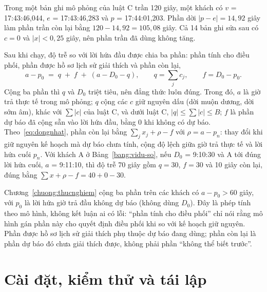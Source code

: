 Trong một bản ghi mô phỏng của luật C trần 120 giây, một khách có $v$ = 17:43:46,044, $e$ = 17:43:46,283 và
$p$ = 17:44:01,203. Phần dời $|p - e| = 14{,}92$ giây làm phần trần còn lại bằng $120 - 14{,}92 = 105{,}08$ giây.
Cả 14 bản ghi sửa sau có $c = 0$ và $|x| < 0{,}25$ giây, nên phần trần đã dùng không tăng.

Sau khi chạy, độ trễ so với lời hứa đầu được chia ba phần: phần tính cho điều phối, phần được hồ sơ lịch sử giải
thích và phần còn lại,
\begin{equation}
a - p_0 \;=\; q \;+\; f \;+\; (a - D_0 - q), \qquad q = \sum_{j} c_j, \qquad f = D_0 - p_0 .
\label{eq:so}
\end{equation}
Cộng ba phần thì $q$ và $D_0$ triệt tiêu, nên đẳng thức luôn đúng. Trong đó, $a$ là giờ trả thực tế trong mô
phỏng; $q$ cộng các $c$ giữ nguyên dấu (dời muộn dương, dời sớm âm), khác với $\sum |c|$ của luật C, và dưới luật
C, $|q| \le \sum |c| \le B$; $f$ là phần dự báo đã cộng sẵn vào lời hứa đầu, bằng 0 khi không có dự báo.
Theo~\eqref{eq:dongnhat}, phần còn lại bằng $\sum_j x_j + \rho - f$ với $\rho = a - p_n$: thay đổi khi giữ nguyên
kế hoạch mà dự báo chưa tính, cộng độ lệch giữa giờ trả thực tế và lời hứa cuối $p_n$. Với khách A ở
Bảng~\ref{bang:vidu-so}, nếu $D_0$ = 9:10:30 và A tới đúng lời hứa cuối, $a$ = 9:11:10, thì độ trễ 70 giây gồm
$q = 30$, $f = 30$ và 10 giây còn lại, đúng bằng $\sum x + \rho - f = 40 + 0 - 30$.

Chương~\ref{chuong:thucnghiem} cộng ba phần trên các khách có $a - p_0 > 60$ giây, với $p_0$ là lời hứa giờ trả
đầu không dự báo (không dùng $D_0$). Đây là phép tính theo mô hình, không kết luận ai có lỗi: ``phần tính cho điều
phối'' chỉ nói rằng mô hình gán phần này cho quyết định điều phối khi so với kế hoạch giữ nguyên. Phần được hồ sơ
lịch sử giải thích phụ thuộc dự báo đang dùng; phần còn lại là phần dự báo đó chưa giải thích được, không phải phần
``không thể biết trước''.

\section{Cài đặt, kiểm thử và tái lập}
\label{muc:caidat}

